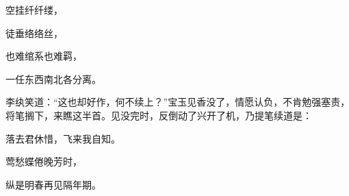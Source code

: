 \begin{poem}

    \begin{pl}

        空挂纤纤缕，
    \end{pl}
    \begin{pl}

        徒垂络络丝，
    \end{pl}
    \begin{pl}

        也难绾系也难羁，
    \end{pl}
    \begin{pl}

        一任东西南北各分离。
    \end{pl}
\end{poem}

\begin{parag}

    李纨笑道：“这也却好作，何不续上？”宝玉见香没了，情愿认负，不肯勉强塞责，将笔搁下，来瞧这半首。见没完时，反倒动了兴开了机，乃提笔续道是：
\end{parag}

\begin{poem}

    \begin{pl}

        落去君休惜，飞来我自知。
    \end{pl}
    \begin{pl}

        莺愁蝶倦晚芳时，
    \end{pl}
    \begin{pl}

        纵是明春再见隔年期。
    \end{pl}
\end{poem}

